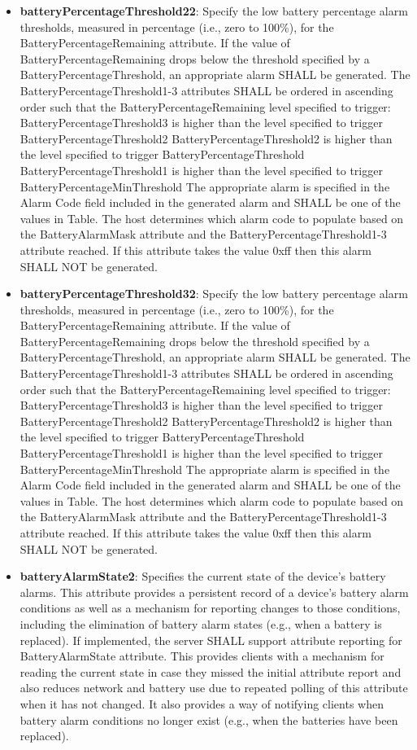 \begin{itemize}
\item \textbf{batteryPercentageThreshold22}: Specify the low battery percentage alarm thresholds, measured in percentage (i.e., zero to 100\%), for the BatteryPercentageRemaining attribute. If the value of BatteryPercentageRemaining drops below the threshold specified by a BatteryPercentageThreshold, an appropriate alarm SHALL be generated. The BatteryPercentageThreshold1-3 attributes SHALL be ordered in ascending order such that the BatteryPercentageRemaining level specified to trigger: BatteryPercentageThreshold3 is higher than the level specified to trigger BatteryPercentageThreshold2 BatteryPercentageThreshold2 is higher than the level specified to trigger BatteryPercentageThreshold BatteryPercentageThreshold1 is higher than the level specified to trigger BatteryPercentageMinThreshold The appropriate alarm is specified in the Alarm Code field included in the generated alarm and SHALL be one of the values in Table. The host determines which alarm code to populate based on the BatteryAlarmMask attribute and the BatteryPercentageThreshold1-3 attribute reached. If this attribute takes the value 0xff then this alarm SHALL NOT be generated.
\item \textbf{batteryPercentageThreshold32}: Specify the low battery percentage alarm thresholds, measured in percentage (i.e., zero to 100\%), for the BatteryPercentageRemaining attribute. If the value of BatteryPercentageRemaining drops below the threshold specified by a BatteryPercentageThreshold, an appropriate alarm SHALL be generated. The BatteryPercentageThreshold1-3 attributes SHALL be ordered in ascending order such that the BatteryPercentageRemaining level specified to trigger: BatteryPercentageThreshold3 is higher than the level specified to trigger BatteryPercentageThreshold2 BatteryPercentageThreshold2 is higher than the level specified to trigger BatteryPercentageThreshold BatteryPercentageThreshold1 is higher than the level specified to trigger BatteryPercentageMinThreshold The appropriate alarm is specified in the Alarm Code field included in the generated alarm and SHALL be one of the values in Table. The host determines which alarm code to populate based on the BatteryAlarmMask attribute and the BatteryPercentageThreshold1-3 attribute reached. If this attribute takes the value 0xff then this alarm SHALL NOT be generated.
\item \textbf{batteryAlarmState2}: Specifies the current state of the device's battery alarms. This attribute provides a persistent record of a device's battery alarm conditions as well as a mechanism for reporting changes to those conditions, including the elimination of battery alarm states (e.g., when a battery is replaced). If implemented, the server SHALL support attribute reporting for BatteryAlarmState attribute. This provides clients with a mechanism for reading the current state in case they missed the initial attribute report and also reduces network and battery use due to repeated polling of this attribute when it has not changed. It also provides a way of notifying clients when battery alarm conditions no longer exist (e.g., when the batteries have been replaced).

\end{itemize}
